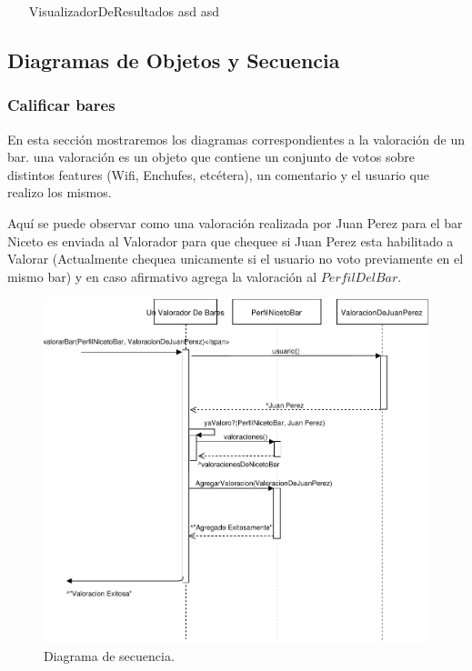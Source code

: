 {\color{red}
\begin{itemize}
  \item[\footnotesize{VisualizadorDeResultados}] asd asd
\end{itemize}
}


\subsection{Diagramas de Objetos y Secuencia}

\subsubsection{Calificar bares}

En esta sección mostraremos los diagramas correspondientes a la valoración de un bar. una valoración es un objeto que contiene un conjunto de votos sobre distintos features (Wifi, Enchufes, etcétera), un comentario y el usuario que realizo los mismos.

Aquí se puede observar como una valoración realizada por Juan Perez para el bar Niceto es enviada al Valorador para que chequee si Juan Perez esta habilitado a Valorar (Actualmente chequea unicamente si el usuario no voto previamente en el mismo bar) y en caso afirmativo agrega la valoración al $Perfil Del Bar$.

\begin{figure}[H]
  \centering
  \includegraphics[width=\textwidth]{diagramas/secuencia_1.pdf}
  \caption{\normalfont Diagrama de secuencia.}
\end{figure}

